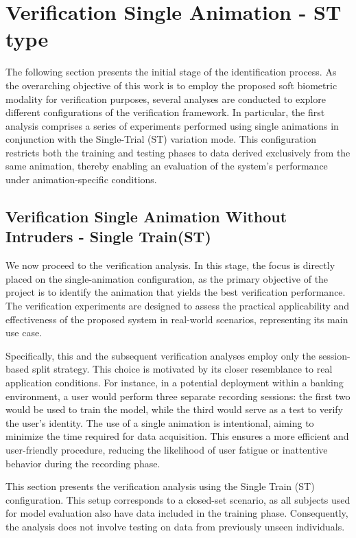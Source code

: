 \documentclass[12pt]{report}
\begin{document}
\section{Verification Single Animation - ST type}
\label{subsec:prima_ver}

The following section presents the initial stage of the identification process.
As the overarching objective of this work is to employ the proposed soft biometric modality for verification purposes, several analyses are conducted to explore different configurations of the verification framework.
In particular, the first analysis comprises a series of experiments performed using single animations in conjunction with the Single-Trial (ST) variation mode.
This configuration restricts both the training and testing phases to data derived exclusively from the same animation, thereby enabling an evaluation of the system's performance under animation-specific conditions.

\subsection{Verification Single Animation Without Intruders - Single Train(ST)}
\label{subsec:vs_st}

We now proceed to the verification analysis.
In this stage, the focus is directly placed on the single-animation configuration, as the primary objective of the project is to identify the animation that yields the best verification performance.
The verification experiments are designed to assess the practical applicability and effectiveness of the proposed system in real-world scenarios, representing its main use case.

Specifically, this and the subsequent verification analyses employ only the session-based split strategy.
This choice is motivated by its closer resemblance to real application conditions.
For instance, in a potential deployment within a banking environment, a user would perform three separate recording sessions: the first two would be used to train the model, while the third would serve as a test to verify the user's identity.
The use of a single animation is intentional, aiming to minimize the time required for data acquisition.
This ensures a more efficient and user-friendly procedure, reducing the likelihood of user fatigue or inattentive behavior during the recording phase.

This section presents the verification analysis using the Single Train (ST) configuration.
This setup corresponds to a closed-set scenario, as all subjects used for model evaluation also have data included in the training phase.
Consequently, the analysis does not involve testing on data from previously unseen individuals.
\end{document}
